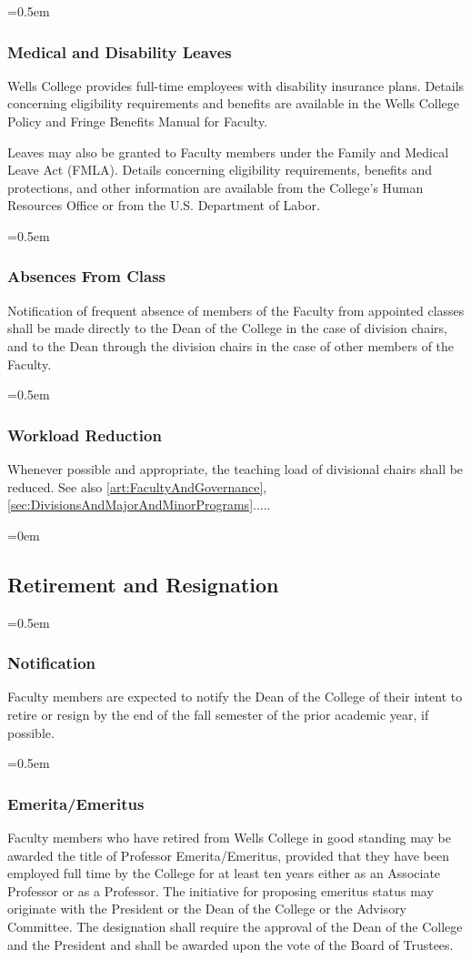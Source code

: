 \documentclass{manual}
\let\oldsubsection\subsection
\renewcommand\subsection{\leftskip=0em\oldsubsection}
\let\oldsubsubsection\subsubsection
\renewcommand\subsubsection{\leftskip=0.5em\oldsubsubsection}
\begin{document}
\subsubsection{Medical and Disability Leaves}
Wells College provides full-time employees with disability insurance plans. Details concerning eligibility requirements and benefits are available in the Wells College Policy and Fringe Benefits Manual for Faculty.

Leaves may also be granted to Faculty members under the Family and Medical Leave Act (FMLA). Details concerning eligibility requirements, benefits and protections, and other information are available from the College's Human Resources Office or from the U.S. Department of Labor.

\subsubsection{Absences From Class}
Notification of frequent absence of members of the Faculty from appointed classes shall be made directly to the Dean of the College in the case of division chairs, and to the Dean through the division chairs in the case of other members of the Faculty.

\subsubsection{Workload Reduction} \label{sub:WorkloadReduction}
Whenever possible and appropriate, the teaching load of divisional chairs shall be reduced. See also \cref{art:FacultyAndGovernance}, \cref{sec:DivisionsAndMajorAndMinorPrograms}.....

\subsection{Retirement and Resignation}

\subsubsection{Notification}
Faculty members are expected to notify the Dean of the College of their intent to retire or resign by the end of the fall semester of the prior academic year, if possible.

\subsubsection{Emerita/Emeritus}
Faculty members who have retired from Wells College in good standing may be awarded the title of Professor Emerita/Emeritus, provided that they have been employed full time by the College for at least ten years either as an Associate Professor or as a Professor. The initiative for proposing emeritus status may originate with the President or the Dean of the College or the Advisory Committee. The designation shall require the approval of the Dean of the College and the President and shall be awarded upon the vote of the Board of Trustees.
\end{document}
